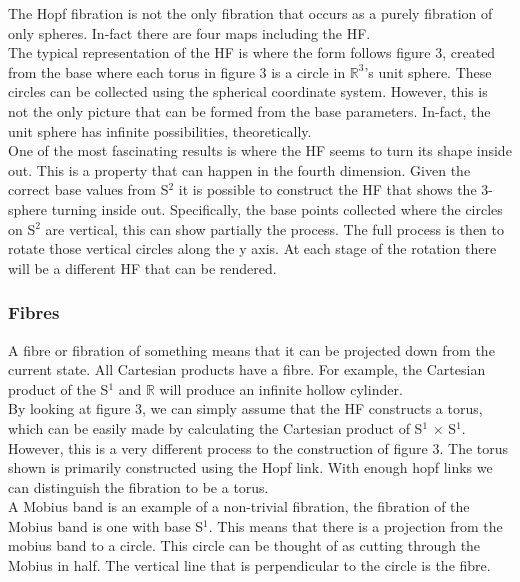 \documentclass[12pt]{article} %
\begin{document}
\begin{flushleft}
The Hopf fibration is not the only fibration that occurs as a purely fibration of only spheres. In-fact there are four maps including the HF.\\

The typical representation of the HF is where the form follows figure 3, created from the base where each torus in figure 3 is a circle in $\mathbb{R}^{3}$'s unit sphere. These circles can be collected using the spherical coordinate system. However, this is not the only picture that can be formed from the base parameters. In-fact, the unit sphere has infinite possibilities, theoretically.\\  

One of the most fascinating results is where the HF seems to turn its shape inside out. This is a property that can happen in the fourth dimension. Given the correct base values from S$^{2}$ it is possible to construct the HF that shows the 3-sphere turning inside out. Specifically, the base points collected where the circles on S$^{2}$ are vertical, this can show partially the process. The full process is then to rotate those vertical circles along the y axis. At each stage of the rotation there will be a different HF that can be rendered.\\

\subsubsection{Fibres} %
A fibre or fibration of something means that it can be projected down from the current state. All Cartesian products have a fibre. For example, the Cartesian product of the S$^{1}$ and $\mathbb{R}$ will produce an infinite hollow cylinder. \\
By looking at figure 3, we can simply assume that the HF constructs a torus, which can be easily made by calculating the Cartesian product of S$^{1}$ $\times$ S$^{1}$. However, this is a very different process to the construction of figure 3. The torus shown is primarily constructed using the Hopf link. With enough hopf links we can distinguish the fibration to be a torus.\\

A Mobius band is an example of a non-trivial fibration, the fibration of the Mobius band is one with base S$^{1}$. This means that there is a projection from the mobius band to a circle. This circle can be thought of as cutting through the Mobius in half. The vertical line that is perpendicular to the circle is the fibre. \\


\end{flushleft}
\end{document}
